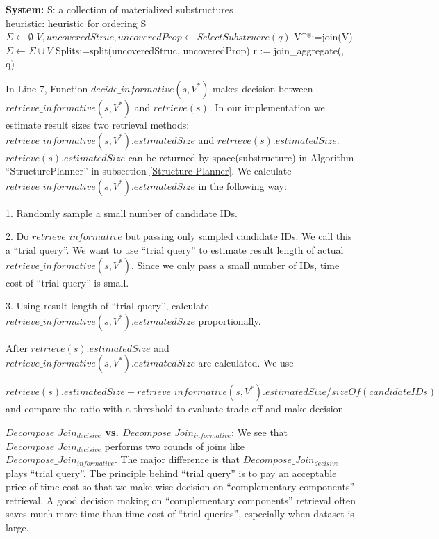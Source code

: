 \begin{algorithm}[H]
\caption{$Decompose\_Join_{decisive}$}
\LinesNumbered
\textbf{System:} S: a collection of materialized substructures\\ heuristic: heuristic for ordering S\\
$\Sigma \gets \emptyset $\;
$V, uncoveredStruc, uncoveredProp \gets SelectSubstrucre(q) $\;
V^{*}:=join(V)\;
$\Sigma \gets \Sigma \cup V $\;
Splits:=split(uncoveredStruc, uncoveredProp)\;
r := join\_aggregate(\Sigma, q)\;
\end{algorithm}
\clearpage

In Line 7, Function $decide\_informative(s,V^{*})$ makes decision between $retrieve\_{informative}(s, V^{*})$ and $retrieve(s)$. In our implementation we estimate result sizes two retrieval methods: $retrieve\_{informative}(s, V^{*}).estimatedSize$ and $retrieve(s).estimatedSize$. $retrieve(s).estimatedSize$ can be returned by space(substructure) in Algorithm ``StructurePlanner'' in subsection \ref{Structure Planner}. We calculate $retrieve\_{informative}(s, V^{*}).estimatedSize$ in the following way:

1. Randomly sample a small number of candidate IDs.  

2. Do $retrieve\_{informative}$ but passing only sampled candidate IDs. We call this a ``trial query''. We want to use ``trial query'' to estimate result length of actual $retrieve\_{informative}(s, V^{*})$. Since we only pass a small number of IDs, time cost of ``trial query'' is small.

3. Using result length of ``trial query'', calculate $retrieve\_{informative}(s, V^{*}).estimatedSize$ proportionally.

After $retrieve(s).estimatedSize$ and $retrieve\_{informative}(s, V^{*}).estimatedSize$ are calculated. We use 

$retrieve(s).estimatedSize - retrieve\_{informative}(s, V^{*}).estimatedSize / sizeOf(candidateIDs)$ and compare the ratio with a threshold to evaluate trade-off and make decision.

\textbf{$Decompose\_Join_{decisive}$ vs. $Decompose\_Join_{informative}$}: We see that $Decompose\_Join_{decisive}$ performs two rounds of joins like $Decompose\_Join_{informative}$. The major difference is that $Decompose\_Join_{decisive}$ plays ``trial query''. The principle behind ``trial query'' is to pay an acceptable price of time cost so that we make wise decision on ``complementary components'' retrieval. A good decision making on ``complementary components'' retrieval often saves much more time than time cost of ``trial queries'', especially when dataset is large. 




